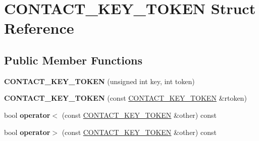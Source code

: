 \hypertarget{struct_c_o_n_t_a_c_t___k_e_y___t_o_k_e_n}{\section{C\+O\+N\+T\+A\+C\+T\+\_\+\+K\+E\+Y\+\_\+\+T\+O\+K\+E\+N Struct Reference}
\label{struct_c_o_n_t_a_c_t___k_e_y___t_o_k_e_n}
}
\subsection*{Public Member Functions}
\begin{DoxyCompactItemize}
\item 
\hypertarget{struct_c_o_n_t_a_c_t___k_e_y___t_o_k_e_n_a482c5bff119f350e0bceed3a34418669}{{\bfseries C\+O\+N\+T\+A\+C\+T\+\_\+\+K\+E\+Y\+\_\+\+T\+O\+K\+E\+N} (unsigned int key, int token)}\label{struct_c_o_n_t_a_c_t___k_e_y___t_o_k_e_n_a482c5bff119f350e0bceed3a34418669}

\item 
\hypertarget{struct_c_o_n_t_a_c_t___k_e_y___t_o_k_e_n_a97e41c197782e4eacd1c61a1208c536f}{{\bfseries C\+O\+N\+T\+A\+C\+T\+\_\+\+K\+E\+Y\+\_\+\+T\+O\+K\+E\+N} (const \hyperlink{struct_c_o_n_t_a_c_t___k_e_y___t_o_k_e_n}{C\+O\+N\+T\+A\+C\+T\+\_\+\+K\+E\+Y\+\_\+\+T\+O\+K\+E\+N} \&rtoken)}\label{struct_c_o_n_t_a_c_t___k_e_y___t_o_k_e_n_a97e41c197782e4eacd1c61a1208c536f}

\item 
\hypertarget{struct_c_o_n_t_a_c_t___k_e_y___t_o_k_e_n_af5bff75ed53540537ae802d31abcdb33}{bool {\bfseries operator$<$} (const \hyperlink{struct_c_o_n_t_a_c_t___k_e_y___t_o_k_e_n}{C\+O\+N\+T\+A\+C\+T\+\_\+\+K\+E\+Y\+\_\+\+T\+O\+K\+E\+N} \&other) const }\label{struct_c_o_n_t_a_c_t___k_e_y___t_o_k_e_n_af5bff75ed53540537ae802d31abcdb33}

\item 
\hypertarget{struct_c_o_n_t_a_c_t___k_e_y___t_o_k_e_n_ae7f41c01edf2e91809c8e8d32ed70c86}{bool {\bfseries operator$>$} (const \hyperlink{struct_c_o_n_t_a_c_t___k_e_y___t_o_k_e_n}{C\+O\+N\+T\+A\+C\+T\+\_\+\+K\+E\+Y\+\_\+\+T\+O\+K\+E\+N} \&other) const }\label{struct_c_o_n_t_a_c_t___k_e_y___t_o_k_e_n_ae7f41c01edf2e91809c8e8d32ed70c86}

\end{DoxyCompactItemize}
